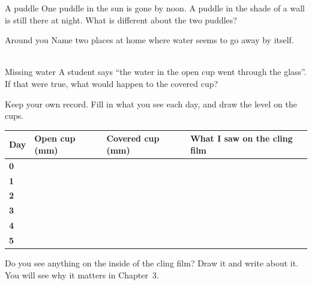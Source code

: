 \begin{puzzle}{A puddle}
One puddle in the sun is gone by noon. A puddle in the shade of a wall is still there at night. What is different about the two puddles? \wline[5cm]
\end{puzzle}

\begin{puzzle}{Around you}
Name two places at home where water seems to go away by itself.\\
\wline[5cm]\\[8pt]\wline[5cm]
\end{puzzle}

\begin{puzzle}{Missing water}
A student says ``the water in the open cup went through the glass''. If that were true, what would happen to the covered cup? \wline[6cm]
\end{puzzle}

\clearpage
\thispagestyle{fancy}
Keep your own record. Fill in what you see each day, and draw the level on the cups.\par\medskip
\renewcommand{\arraystretch}{3.0}
\begin{tabularx}{\linewidth}{|>{\sffamily\small\bfseries}p{1.4cm}|X|X|X|}
\hline
Day & Open cup (mm) & Covered cup (mm) & What I saw on the cling film \\ \hline
0 & & & \\ \hline
1 & & & \\ \hline
2 & & & \\ \hline
3 & & & \\ \hline
4 & & & \\ \hline
5 & & & \\ \hline
\end{tabularx}

\vspace{6pt}
Do you see anything on the inside of the cling film? Draw it and write about it. You will see why it matters in Chapter~3.\par\medskip
{}
\clearpage
